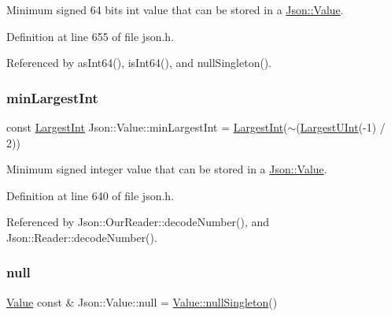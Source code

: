 Minimum signed 64 bits int value that can be stored in a \hyperlink{class_json_1_1_value}{Json\+::\+Value}. 



Definition at line 655 of file json.\+h.



Referenced by as\+Int64(), is\+Int64(), and null\+Singleton().

\mbox{\label{class_json_1_1_value_af91df130daa50dd43d2cd89e6ee67706}} 
\subsubsection{\texorpdfstring{min\+Largest\+Int}{minLargestInt}}
{\footnotesize\ttfamily const \hyperlink{class_json_1_1_value_a1cbb82642ed05109b9833e49f042ece7}{Largest\+Int} Json\+::\+Value\+::min\+Largest\+Int = \hyperlink{class_json_1_1_value_a1cbb82642ed05109b9833e49f042ece7}{Largest\+Int}($\sim$(\hyperlink{class_json_1_1_value_a6682a3684d635e03fc06ba229fa24eec}{Largest\+U\+Int}(-\/1) / 2))\hspace{0.3cm}{\ttfamily [static]}}



Minimum signed integer value that can be stored in a \hyperlink{class_json_1_1_value}{Json\+::\+Value}. 



Definition at line 640 of file json.\+h.



Referenced by Json\+::\+Our\+Reader\+::decode\+Number(), and Json\+::\+Reader\+::decode\+Number().

\mbox{\label{class_json_1_1_value_a21ddb05b92c60c7548e928bf371e7d45}} 
\subsubsection{\texorpdfstring{null}{null}}
{\footnotesize\ttfamily \hyperlink{class_json_1_1_value}{Value} const  \& Json\+::\+Value\+::null = \hyperlink{class_json_1_1_value_af2f124567acc35d021a424e53ebdfcab}{Value\+::null\+Singleton}()\hspace{0.3cm}{\ttfamily [static]}}



